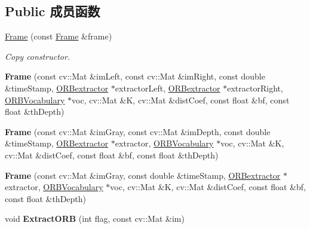 \subsection*{Public 成员函数}
\begin{DoxyCompactItemize}
\item 
\hyperlink{classORB__SLAM2_1_1Frame_ac7e6ed9973b81ec85e91228e3d4ecf22}{Frame} (const \hyperlink{classORB__SLAM2_1_1Frame}{Frame} \&frame)
\begin{DoxyCompactList}\small\item\em Copy constructor. \end{DoxyCompactList}\item 
\hypertarget{classORB__SLAM2_1_1Frame_a24d3c1a1a811fa0f9d44e717a044b2a4}{{\bfseries Frame} (const cv\-::\-Mat \&im\-Left, const cv\-::\-Mat \&im\-Right, const double \&time\-Stamp, \hyperlink{classORB__SLAM2_1_1ORBextractor}{O\-R\-Bextractor} $\ast$extractor\-Left, \hyperlink{classORB__SLAM2_1_1ORBextractor}{O\-R\-Bextractor} $\ast$extractor\-Right, \hyperlink{classDBoW2_1_1TemplatedVocabulary}{O\-R\-B\-Vocabulary} $\ast$voc, cv\-::\-Mat \&K, cv\-::\-Mat \&dist\-Coef, const float \&bf, const float \&th\-Depth)}\label{classORB__SLAM2_1_1Frame_a24d3c1a1a811fa0f9d44e717a044b2a4}

\item 
\hypertarget{classORB__SLAM2_1_1Frame_ac205fd2081c647e4841369828902f8fe}{{\bfseries Frame} (const cv\-::\-Mat \&im\-Gray, const cv\-::\-Mat \&im\-Depth, const double \&time\-Stamp, \hyperlink{classORB__SLAM2_1_1ORBextractor}{O\-R\-Bextractor} $\ast$extractor, \hyperlink{classDBoW2_1_1TemplatedVocabulary}{O\-R\-B\-Vocabulary} $\ast$voc, cv\-::\-Mat \&K, cv\-::\-Mat \&dist\-Coef, const float \&bf, const float \&th\-Depth)}\label{classORB__SLAM2_1_1Frame_ac205fd2081c647e4841369828902f8fe}

\item 
\hypertarget{classORB__SLAM2_1_1Frame_a39a57316938495a9ca8a053edd74b414}{{\bfseries Frame} (const cv\-::\-Mat \&im\-Gray, const double \&time\-Stamp, \hyperlink{classORB__SLAM2_1_1ORBextractor}{O\-R\-Bextractor} $\ast$extractor, \hyperlink{classDBoW2_1_1TemplatedVocabulary}{O\-R\-B\-Vocabulary} $\ast$voc, cv\-::\-Mat \&K, cv\-::\-Mat \&dist\-Coef, const float \&bf, const float \&th\-Depth)}\label{classORB__SLAM2_1_1Frame_a39a57316938495a9ca8a053edd74b414}

\item 
\hypertarget{classORB__SLAM2_1_1Frame_a626aef981e9fd9caff63bf93f1abf47f}{void {\bfseries Extract\-O\-R\-B} (int flag, const cv\-::\-Mat \&im)}\label{classORB__SLAM2_1_1Frame_a626aef981e9fd9caff63bf93f1abf47f}


\end{DoxyCompactItemize}
